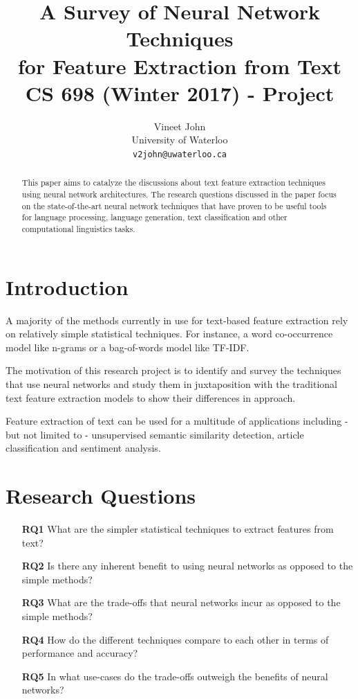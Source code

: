 \documentclass[11pt,a4paper]{article}
\title{A Survey of Neural Network Techniques\\ for Feature Extraction from Text\\ \large CS 698 (Winter 2017) - Project}
\author{
  Vineet John \\
  University of Waterloo \\
  {\tt v2john@uwaterloo.ca} \\
}
\date{}
\begin{document}
\maketitle


\begin{abstract}
  This paper aims to catalyze the discussions about text feature extraction techniques using neural network architectures. 
  The research questions discussed in the paper focus on the state-of-the-art neural network techniques that have proven to be useful tools for language processing, language generation, text classification and other computational linguistics tasks.
\end{abstract}


\section{Introduction} %
\label{sec:introduction}

  A majority of the methods currently in use for text-based feature extraction rely on relatively simple statistical techniques. For instance, a word co-occurrence model like n-grams or a bag-of-words model like TF-IDF.

  The motivation of this research project is to identify and survey the techniques that use neural networks and study them in juxtaposition with the traditional text feature extraction models to show their differences in approach.

  Feature extraction of text can be used for a multitude of applications including - but not limited to - unsupervised semantic similarity detection, article classification and sentiment analysis.


\section{Research Questions} %
\label{sec:research_questions}

  \begin{itemize}
    \item [\textbf{RQ1}] 
    What are the simpler statistical techniques to extract features from text?
    \item [\textbf{RQ2}] 
    Is there any inherent benefit to using neural networks as opposed to the simple methods?
    \item [\textbf{RQ3}] 
    What are the trade-offs that neural networks incur as opposed to the simple methods?
    \item [\textbf{RQ4}] 
    How do the different techniques compare to each other in terms of performance and accuracy?
    \item [\textbf{RQ5}] 
    In what use-cases do the trade-offs outweigh the benefits of neural networks?
  \end{itemize}
\end{document}
